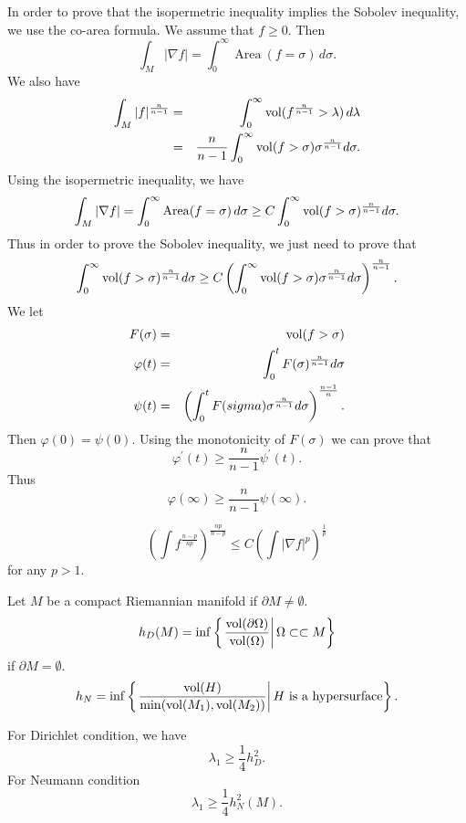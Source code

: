 In order to prove that the isopermetric inequality implies the Sobolev inequality, we use the co-area formula. We assume that $ f \geq 0 $. Then 
%
\[ \int_M | \nabla f| = \int ^\infty_0  \ \mbox{Area} \  (f = \sigma ) \, d \sigma .\]
%
We also have 
%
\begin{eqnarray*}
\int_M |f|  ^{\frac{n}{n-1}} & =& \int ^\infty_0 {\rm vol} ( f ^{\frac{n}{n-1}}> \lambda ) \, d \lambda \\
& = &  \frac{n}{n-1}\int^\infty_0 {\rm vol} (f > \sigma ) \sigma ^{\frac{n}{n-1}} d \sigma .
\end{eqnarray*}
%
Using the isopermetric inequality, we have 
%
\[ \int_M |\nabla f| = \int ^\infty _0 {\rm Area} (f = \sigma ) \, d \sigma \geq C \int^\infty _0 {\rm vol} (f > \sigma ) ^{\frac{n}{n-1}} d \sigma.\]
Thus in order to prove the Sobolev inequality, we just need to prove that 
\[ \int ^\infty _0   {\rm vol} (f > \sigma ) ^{\frac{n}{n-1}} d \sigma \geq C \left( \int ^\infty _0 {\rm vol}  (f > \sigma ) \sigma ^{\frac{n}{n-1}} d \sigma \right) ^{\frac{n}{n-1}} .\]
We let 
\begin{eqnarray*}
 F(\sigma) & = & {\rm vol} (f > \sigma) \\
\varphi (t) & = & \int^t_0 F(\sigma) ^{\frac{n}{n-1}} d \sigma \\
\psi (t) & = &  \left( \int ^t _0 F(sigma ) \sigma ^{\frac{n}{n-1}} d \sigma \right) ^{\frac{n-1}{n}}. \end{eqnarray*}
%
Then $ \varphi (0) = \psi (0) $. Using the monotonicity of $ F(\sigma) $ we can prove that 
%
\[ \varphi ^\prime (t) \geq  \frac{n}{n-1} \psi^\prime (t) .\]
%
Thus
%
\[ \varphi (\infty) \geq \frac{n}{n-1} \psi (\infty) .\]

\begin{corollary}
\[ \left( \int  f  ^{\frac{n-p}{np}}\right) ^{\frac{np}{n-p}}  \leq C\left( \int |\nabla f |^p \right) ^{\frac{1}{p}}\]
for any $ p > 1$.
\end{corollary}
\begin{definition} Let $M$ be a compact Riemannian manifold if $ \partial M \neq \emptyset$.
%
\[ h_D (M) = \inf \left\{ \left.\frac{{\rm vol} ( \partial \Omega )}{{\rm vol} ( \Omega)} \right| \Omega \subset \subset M\right\}\]
if $  \partial M = \emptyset$.
%
\[ h_N = \inf  \left\{ \left.\frac{{\rm vol}( H )}{\min ({\rm vol} (M_1), {\rm vol} (M_2) )} \right| H \ \mbox{is a hypersurface} \right\}.\]
%
\end{definition}
\begin{theorem}[Cheeger] For Dirichlet condition, we have 
%
\[ \lambda _ 1 \geq \frac{1}{4} h^2_D. \]
%
For Neumann condition
%
\[ \lambda _1 \geq \frac{1}{4} h^2_N (M) .\]
\end{theorem}

